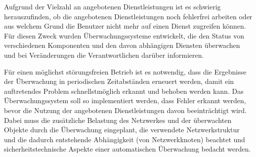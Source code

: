 

Aufgrund der Vielzahl an angebotenen Dienstleistungen ist es schwierig herauszufinden, ob die angebotenen Dienstleistungen noch fehlerfrei arbeiten oder aus welchem Grund die Benutzer nicht mehr auf einen Dienst zugreifen können.
Für diesen Zweck wurden Überwachungssysteme entwickelt, die den Status von verschiedenen Komponenten und den davon abhängigen Diensten überwachen und bei Veränderungen die Verantwortlichen darüber informieren.

Für einen möglichst störungsfreien Betrieb ist es notwendig, dass die Ergebnisse der Überwachung in periodischen Zeitabständen erneuert werden, damit ein auftretendes Problem schnellstmöglich erkannt und behoben werden kann.
Das Überwachungssystem soll so implementiert werden, dass Fehler erkannt werden, bevor die Nutzung der angebotenen Dienstleistungen davon beeinträchtigt wird.
Dabei muss die zusätzliche Belastung des Netzwerkes und der überwachten Objekte durch die Überwachung eingeplant, die verwendete Netzwerkstruktur und die dadurch entstehende Abhängigkeit (von Netzwerkknoten) beachtet und sicherheitstechnische Aspekte einer automatischen Überwachung bedacht werden.\\


